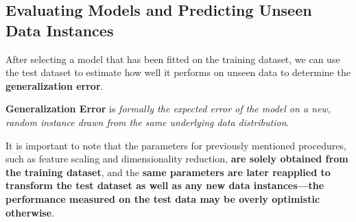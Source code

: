 \documentclass[../machine_learning_scikit.tex]{subfiles}
\begin{document}
    \subsection{Evaluating Models and Predicting Unseen Data Instances}

    After selecting a model that has been fitted on the training dataset, we can use the test dataset to estimate how well it performs on unseen data to determine the \textbf{generalization error}.

    \begin{mydef}
        \textbf{Generalization Error} is \textit{formally the expected error of the model on a new, random instance drawn from the same underlying data distribution}.
    \end{mydef}

    \begin{obs}
        It is important to note that the parameters for previously mentioned procedures, such as feature scaling and dimensionality reduction, \textbf{are solely obtained from the training dataset}, and the \textbf{same parameters are later reapplied to transform the test dataset as well as any new data instances—the performance measured on the test data may be overly optimistic otherwise}.
    \end{obs}
\end{document}

